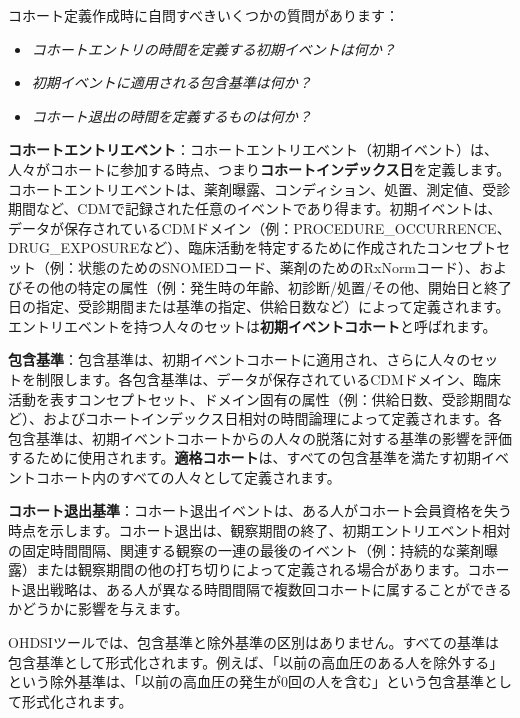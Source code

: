 \documentclass[
  11pt]{book}
\makeatletter
\providecommand{\tightlist}{%
  \setlength{\itemsep}{0pt}\setlength{\parskip}{0pt}}
\newenvironment{kframe}{%
\medskip{}
\setlength{\fboxsep}{.8em}
 \def\at@end@of@kframe{}%
 \ifinner\ifhmode%
  \def\at@end@of@kframe{\end{minipage}}%
  \begin{minipage}{\columnwidth}%
 \fi\fi%
 \def\FrameCommand##1{\hskip\@totalleftmargin \hskip-\fboxsep
 \colorbox{myShadeColor}{##1}\hskip-\fboxsep
     \hskip-\linewidth \hskip-\@totalleftmargin \hskip\columnwidth}%
 \MakeFramed {\advance\hsize-\width
   \@totalleftmargin\z@ \linewidth\hsize
   \@setminipage}}%
 {\par\unskip\endMakeFramed%
 \at@end@of@kframe}
\newenvironment{rmdblock}[1]
  {
  \begin{itemize}
  \renewcommand{\labelitemi}{
    \raisebox{-.7\height}[0pt][0pt]{
      {\setkeys{Gin}{width=3em,keepaspectratio}\texttt{[image: images/\#1]}}
    }
  }
  \setlength{\fboxsep}{1em}
  \begin{kframe}
  \item
  }
  {
  \end{kframe}
  \end{itemize}
  }
\newenvironment{rmdimportant}
  {\begin{rmdblock}{important}}
  {\end{rmdblock}}
\theoremstyle{definition}
\theoremstyle{definition}
\theoremstyle{definition}
\theoremstyle{definition}
\theoremstyle{remark}
\makeatother
\begin{document}
コホート定義作成時に自問すべきいくつかの質問があります：

\begin{itemize}
\tightlist
\item
  \emph{コホートエントリの時間を定義する初期イベントは何か？}
\item
  \emph{初期イベントに適用される包含基準は何か？}
\item
  \emph{コホート退出の時間を定義するものは何か？}
\end{itemize}

\textbf{コホートエントリエベント}：コホートエントリエベント（初期イベント）は、人々がコホートに参加する時点、つまり\textbf{コホートインデックス日}を定義します。コホートエントリエベントは、薬剤曝露、コンディション、処置、測定値、受診期間など、CDMで記録された任意のイベントであり得ます。初期イベントは、データが保存されているCDMドメイン（例：PROCEDURE\_OCCURRENCE、DRUG\_EXPOSUREなど）、臨床活動を特定するために作成されたコンセプトセット（例：状態のためのSNOMEDコード、薬剤のためのRxNormコード）、およびその他の特定の属性（例：発生時の年齢、初診断/処置/その他、開始日と終了日の指定、受診期間または基準の指定、供給日数など）によって定義されます。エントリエベントを持つ人々のセットは\textbf{初期イベントコホート}と呼ばれます。

\textbf{包含基準}：包含基準は、初期イベントコホートに適用され、さらに人々のセットを制限します。各包含基準は、データが保存されているCDMドメイン、臨床活動を表すコンセプトセット、ドメイン固有の属性（例：供給日数、受診期間など）、およびコホートインデックス日相対の時間論理によって定義されます。各包含基準は、初期イベントコホートからの人々の脱落に対する基準の影響を評価するために使用されます。\textbf{適格コホート}は、すべての包含基準を満たす初期イベントコホート内のすべての人々として定義されます。

\textbf{コホート退出基準}：コホート退出イベントは、ある人がコホート会員資格を失う時点を示します。コホート退出は、観察期間の終了、初期エントリエベント相対の固定時間間隔、関連する観察の一連の最後のイベント（例：持続的な薬剤曝露）または観察期間の他の打ち切りによって定義される場合があります。コホート退出戦略は、ある人が異なる時間間隔で複数回コホートに属することができるかどうかに影響を与えます。 

\begin{rmdimportant}
OHDSIツールでは、包含基準と除外基準の区別はありません。すべての基準は包含基準として形式化されます。例えば、「以前の高血圧のある人を除外する」という除外基準は、「以前の高血圧の発生が0回の人を含む」という包含基準として形式化されます。
\end{rmdimportant}
\end{document}
